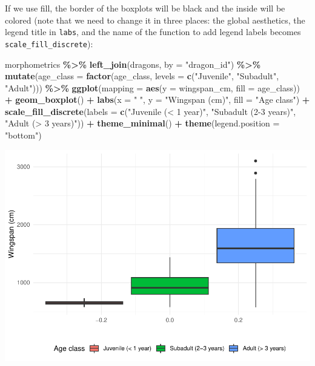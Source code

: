 \documentclass[
]{book}
\newenvironment{Shaded}{\begin{snugshade}}{\end{snugshade}}
\newcommand{\AttributeTok}[1]{\textcolor[rgb]{0.13,0.29,0.53}{#1}}
\newcommand{\FunctionTok}[1]{\textcolor[rgb]{0.13,0.29,0.53}{\textbf{#1}}}
\newcommand{\NormalTok}[1]{#1}
\newcommand{\SpecialCharTok}[1]{\textcolor[rgb]{0.81,0.36,0.00}{\textbf{#1}}}
\newcommand{\StringTok}[1]{\textcolor[rgb]{0.31,0.60,0.02}{#1}}
\begin{document}
If we use fill, the border of the boxplots will be black and the inside will
be colored (note that we need to change it in three places: the global
aesthetics, the legend title in \texttt{labs}, and the name of the function to add
legend labels becomes \texttt{scale\_fill\_discrete}):

\begin{Shaded}
\begin{Highlighting}[]
\NormalTok{morphometrics }\SpecialCharTok{\%\textgreater{}\%} 
  \FunctionTok{left\_join}\NormalTok{(dragons, }\AttributeTok{by =} \StringTok{"dragon\_id"}\NormalTok{) }\SpecialCharTok{\%\textgreater{}\%} 
  \FunctionTok{mutate}\NormalTok{(}\AttributeTok{age\_class =} \FunctionTok{factor}\NormalTok{(age\_class, }\AttributeTok{levels =} \FunctionTok{c}\NormalTok{(}\StringTok{"Juvenile"}\NormalTok{,}
                                                  \StringTok{"Subadult"}\NormalTok{,}
                                                  \StringTok{"Adult"}\NormalTok{))) }\SpecialCharTok{\%\textgreater{}\%} 
\FunctionTok{ggplot}\NormalTok{(}\AttributeTok{mapping =} \FunctionTok{aes}\NormalTok{(}\AttributeTok{y =}\NormalTok{ wingspan\_cm, }\AttributeTok{fill =}\NormalTok{ age\_class)) }\SpecialCharTok{+}
  \FunctionTok{geom\_boxplot}\NormalTok{() }\SpecialCharTok{+}
  \FunctionTok{labs}\NormalTok{(}\AttributeTok{x =} \StringTok{" "}\NormalTok{, }\AttributeTok{y =} \StringTok{"Wingspan (cm)"}\NormalTok{, }\AttributeTok{fill =} \StringTok{"Age class"}\NormalTok{) }\SpecialCharTok{+}
  \FunctionTok{scale\_fill\_discrete}\NormalTok{(}\AttributeTok{labels =} \FunctionTok{c}\NormalTok{(}\StringTok{"Juvenile (\textless{} 1 year)"}\NormalTok{,}
                                 \StringTok{"Subadult (2{-}3 years)"}\NormalTok{,}
                                 \StringTok{"Adult (\textgreater{} 3 years)"}\NormalTok{)) }\SpecialCharTok{+}
  \FunctionTok{theme\_minimal}\NormalTok{() }\SpecialCharTok{+}
  \FunctionTok{theme}\NormalTok{(}\AttributeTok{legend.position =} \StringTok{"bottom"}\NormalTok{) }
\end{Highlighting}
\end{Shaded}

\includegraphics{reproducible-science_files/figure-latex/gg21-1.pdf}
\end{document}
